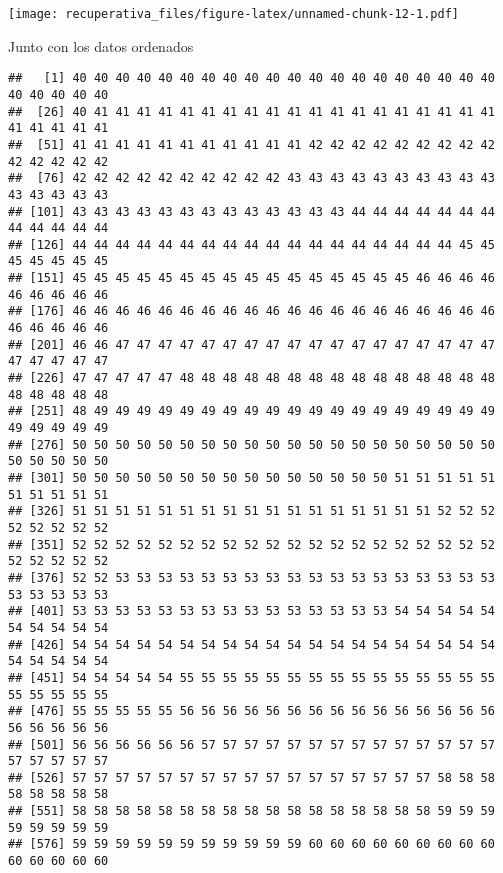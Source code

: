 \documentclass[
  spanish,
]{article}
\newenvironment{Shaded}{\begin{snugshade}}{\end{snugshade}}
\newcommand{\DataTypeTok}[1]{\textcolor[rgb]{0.13,0.29,0.53}{#1}}
\newcommand{\KeywordTok}[1]{\textcolor[rgb]{0.13,0.29,0.53}{\textbf{#1}}}
\newcommand{\NormalTok}[1]{#1}
\newcommand{\OperatorTok}[1]{\textcolor[rgb]{0.81,0.36,0.00}{\textbf{#1}}}
\newcommand{\OtherTok}[1]{\textcolor[rgb]{0.56,0.35,0.01}{#1}}
\begin{document}
\texttt{[image: recuperativa\_files/figure-latex/unnamed-chunk-12-1.pdf]}

Junto con los datos ordenados

\begin{Shaded}
\end{Shaded}

\begin{verbatim}
##   [1] 40 40 40 40 40 40 40 40 40 40 40 40 40 40 40 40 40 40 40 40 40 40 40 40 40
##  [26] 40 41 41 41 41 41 41 41 41 41 41 41 41 41 41 41 41 41 41 41 41 41 41 41 41
##  [51] 41 41 41 41 41 41 41 41 41 41 41 42 42 42 42 42 42 42 42 42 42 42 42 42 42
##  [76] 42 42 42 42 42 42 42 42 42 42 43 43 43 43 43 43 43 43 43 43 43 43 43 43 43
## [101] 43 43 43 43 43 43 43 43 43 43 43 43 43 44 44 44 44 44 44 44 44 44 44 44 44
## [126] 44 44 44 44 44 44 44 44 44 44 44 44 44 44 44 44 44 44 45 45 45 45 45 45 45
## [151] 45 45 45 45 45 45 45 45 45 45 45 45 45 45 45 45 46 46 46 46 46 46 46 46 46
## [176] 46 46 46 46 46 46 46 46 46 46 46 46 46 46 46 46 46 46 46 46 46 46 46 46 46
## [201] 46 46 47 47 47 47 47 47 47 47 47 47 47 47 47 47 47 47 47 47 47 47 47 47 47
## [226] 47 47 47 47 47 48 48 48 48 48 48 48 48 48 48 48 48 48 48 48 48 48 48 48 48
## [251] 48 49 49 49 49 49 49 49 49 49 49 49 49 49 49 49 49 49 49 49 49 49 49 49 49
## [276] 50 50 50 50 50 50 50 50 50 50 50 50 50 50 50 50 50 50 50 50 50 50 50 50 50
## [301] 50 50 50 50 50 50 50 50 50 50 50 50 50 50 50 51 51 51 51 51 51 51 51 51 51
## [326] 51 51 51 51 51 51 51 51 51 51 51 51 51 51 51 51 51 52 52 52 52 52 52 52 52
## [351] 52 52 52 52 52 52 52 52 52 52 52 52 52 52 52 52 52 52 52 52 52 52 52 52 52
## [376] 52 52 53 53 53 53 53 53 53 53 53 53 53 53 53 53 53 53 53 53 53 53 53 53 53
## [401] 53 53 53 53 53 53 53 53 53 53 53 53 53 53 53 54 54 54 54 54 54 54 54 54 54
## [426] 54 54 54 54 54 54 54 54 54 54 54 54 54 54 54 54 54 54 54 54 54 54 54 54 54
## [451] 54 54 54 54 54 55 55 55 55 55 55 55 55 55 55 55 55 55 55 55 55 55 55 55 55
## [476] 55 55 55 55 55 56 56 56 56 56 56 56 56 56 56 56 56 56 56 56 56 56 56 56 56
## [501] 56 56 56 56 56 56 57 57 57 57 57 57 57 57 57 57 57 57 57 57 57 57 57 57 57
## [526] 57 57 57 57 57 57 57 57 57 57 57 57 57 57 57 57 57 58 58 58 58 58 58 58 58
## [551] 58 58 58 58 58 58 58 58 58 58 58 58 58 58 58 58 58 59 59 59 59 59 59 59 59
## [576] 59 59 59 59 59 59 59 59 59 59 59 60 60 60 60 60 60 60 60 60 60 60 60 60 60

\end{verbatim}
\end{document}
